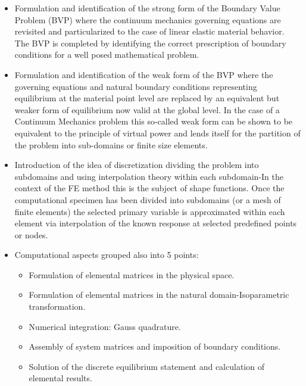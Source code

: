 \begin{itemize}

\item Formulation and identification of the strong form of the Boundary Value Problem (BVP) where the continuum mechanics governing equations are revisited and particularized to the case of linear elastic material behavior. The BVP is completed by identifying the correct prescription of boundary conditions for a well posed mathematical problem.

\item Formulation and identification of the weak form of the BVP where the governing equations and natural boundary conditions representing equilibrium at the material point level are replaced by an equivalent but weaker form of equilibrium now valid at the global level.  In the case of a Continuum Mechanics problem this so-called weak form can be shown to be equivalent to the principle of virtual power and lends itself for the partition of the problem into sub-domains or finite size elements.

\item Introduction of the idea of discretization dividing the problem into subdomains and using interpolation theory within each subdomain-In the context of the FE method this is the subject of shape functions. Once the computational specimen has been divided into subdomains (or a mesh of finite elements) the selected primary variable is approximated within each element via interpolation of the known response at selected predefined points or nodes.

\item Computational aspects grouped also into 5 points:
	\begin{itemize}
	\item Formulation of elemental matrices in the physical space.
	\item Formulation of elemental matrices in the natural domain-Isoparametric transformation.
	\item Numerical integration: Gauss quadrature.
	\item Assembly of system matrices and imposition of boundary conditions.
	\item Solution of the discrete equilibrium statement and calculation of elemental results.
	\end{itemize}
\end{itemize}


